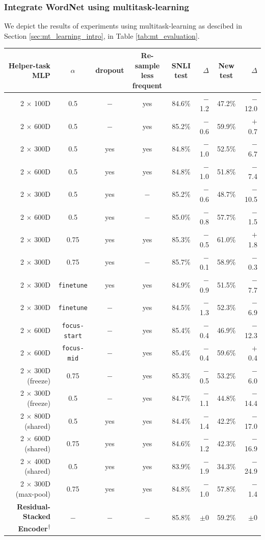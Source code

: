 \subsubsection{Integrate WordNet using multitask-learning}\label{sec:eval_mt}
We depict the results of experiments using multitask-learning as descibed in Section \ref{sec:mt_learning_intro}, in Table \ref{tab:mt_evaluation}.
\begin{table}[tph!]
\centering
\begin{tabular}{rccc|cr|cr}
\textbf{Helper-task MLP} & $\alpha$ & \textbf{dropout} & \specialcellc{\textbf{Re-sample}\\\textbf{less frequent}} & \textbf{\ac{SNLI} test} & $\Delta$ & \textbf{New test} & $\Delta$ \\
\toprule
2 $\times$ 100D & 0.5 & $-$ & yes & 84.6\% & $-$1.2 & 47.2\% & $-$12.0 \\
2 $\times$ 600D & 0.5 & $-$ & yes & 85.2\% & $-$0.6 & 59.9\% & $+$0.7 \\
2 $\times$ 300D & 0.5 & yes & yes & 84.8\% & $-$1.0 & 52.5\% & $-$6.7 \\
2 $\times$ 600D & 0.5 & yes & yes & 84.8\% & $-$1.0 & 51.8\% & $-$7.4 \\
2 $\times$ 300D & 0.5 & yes & $-$ & 85.2\% & $-$0.6 & 48.7\% & $-$10.5 \\
2 $\times$ 600D & 0.5 & yes & $-$ & 85.0\% & $-$0.8 & 57.7\% & $-$1.5 \\
2 $\times$ 300D & 0.75 & yes & yes & 85.3\% & $-$0.5 & 61.0\% & $+$1.8 \\
2 $\times$ 300D & 0.75 & yes & $-$ & 85.7\% & $-$0.1 & 58.9\% & $-$0.3 \\
\midrule
2 $\times$ 300D & \texttt{finetune} & yes & yes & 84.9\% & $-$0.9 & 51.5\% & $-$7.7 \\
2 $\times$ 300D & \texttt{finetune} & $-$ & yes & 84.5\% & $-$1.3 & 52.3\% & $-$6.9 \\
2 $\times$ 600D & \texttt{focus-start} & $-$ & yes & 85.4\% & $-$0.4 & 46.9\% & $-$12.3 \\
2 $\times$ 600D & \texttt{focus-mid} & $-$ & yes & 85.4\% & $-$0.4 & 59.6\% & $+$0.4 \\
\midrule
2 $\times$ 300D (freeze) & 0.75 & $-$ & yes & 85.3\% & $-$0.5 & 53.2\% & $-$6.0 \\
2 $\times$ 300D (freeze) & 0.5 & $-$ & yes & 84.7\% & $-$1.1 & 44.8\% & $-$14.4 \\
2 $\times$ 800D (shared) & 0.5 & yes & yes & 84.4\% & $-$1.4 & 42.2\% & $-$17.0 \\
2 $\times$ 600D (shared) & 0.75 & yes & yes & 84.6\% & $-$1.2 & 42.3\% & $-$16.9 \\
2 $\times$ 400D (shared) & 0.5 & yes & yes & 83.9\% & $-$1.9 & 34.3\% & $-$24.9 \\
\midrule
2 $\times$ 300D (max-pool) & 0.75 & yes & yes & 84.8\% & $-$1.0 & 57.8\% & $-$1.4 \\
\midrule
\textbf{Residual-Stacked Encoder\textsuperscript{$\dagger$}} &$-$&$-$&$-$&85.8\%&$\pm$0&59.2\%& $\pm$0 \\
\bottomrule


\end{tabular}
\end{table}
